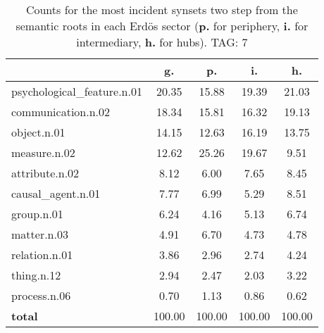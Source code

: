 \begin{table}[h!]
\begin{center}
\begin{tabular}{| l | c | c | c | c |}\hline
 & g. & p. & i. & h. \\\hline
psychological\_feature.n.01 & 20.35  & 15.88  & 19.39  & 21.03 \\\hline
communication.n.02 & 18.34  & 15.81  & 16.32  & 19.13 \\\hline
object.n.01 & 14.15  & 12.63  & 16.19  & 13.75 \\\hline
measure.n.02 & 12.62  & 25.26  & 19.67  & 9.51 \\\hline
attribute.n.02 & 8.12  & 6.00  & 7.65  & 8.45 \\\hline
causal\_agent.n.01 & 7.77  & 6.99  & 5.29  & 8.51 \\\hline
group.n.01 & 6.24  & 4.16  & 5.13  & 6.74 \\\hline
matter.n.03 & 4.91  & 6.70  & 4.73  & 4.78 \\\hline
relation.n.01 & 3.86  & 2.96  & 2.74  & 4.24 \\\hline
thing.n.12 & 2.94  & 2.47  & 2.03  & 3.22 \\\hline
process.n.06 & 0.70  & 1.13  & 0.86  & 0.62 \\\hline
{{\bf total}} & 100.00  & 100.00  & 100.00  & 100.00 \\\hline
\end{tabular}
\caption{Counts for the most incident synsets two step from the semantic roots in each Erd\"os sector ({\bf p.} for periphery, {\bf i.} for intermediary, {\bf h.} for hubs). TAG: 7}
\end{center}
\end{table}